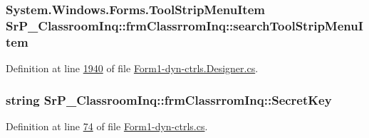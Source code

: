 \hypertarget{class_sr_p___classroom_inq_1_1frm_classrrom_inq_aa54fbd91dddb42716ec00341ee7ac713}{
\subsubsection[{search\-Tool\-Strip\-Menu\-Item}]{\setlength{\rightskip}{0pt plus 5cm}\-System.\-Windows.\-Forms.\-Tool\-Strip\-Menu\-Item {\bf \-Sr\-P\-\_\-\-Classroom\-Inq\-::frm\-Classrrom\-Inq\-::search\-Tool\-Strip\-Menu\-Item}}}
\label{class_sr_p___classroom_inq_1_1frm_classrrom_inq_aa54fbd91dddb42716ec00341ee7ac713}


\-Definition at line \hyperlink{_form1-dyn-ctrls_8_designer_8cs_source_l01940}{1940} of file \hyperlink{_form1-dyn-ctrls_8_designer_8cs_source}{\-Form1-\/dyn-\/ctrls.\-Designer.\-cs}.

\hypertarget{class_sr_p___classroom_inq_1_1frm_classrrom_inq_ae3ddacd233e71c710d89e12401af37c1}{
\subsubsection[{\-Secret\-Key}]{\setlength{\rightskip}{0pt plus 5cm}string {\bf \-Sr\-P\-\_\-\-Classroom\-Inq\-::frm\-Classrrom\-Inq\-::\-Secret\-Key}}}
\label{class_sr_p___classroom_inq_1_1frm_classrrom_inq_ae3ddacd233e71c710d89e12401af37c1}


\-Definition at line \hyperlink{_form1-dyn-ctrls_8cs_source_l00074}{74} of file \hyperlink{_form1-dyn-ctrls_8cs_source}{\-Form1-\/dyn-\/ctrls.\-cs}.

